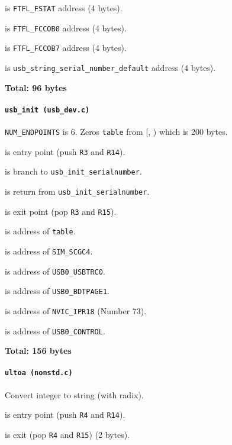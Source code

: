 \vspace{1em}

 is \texttt{FTFL\_FSTAT} address (4 bytes).

 is \texttt{FTFL\_FCCOB0} address (4 bytes).

 is \texttt{FTFL\_FCCOB7} address (4 bytes).

 is {\tiny
\texttt{usb\_string\_serial\_number\_default}} address (4 bytes).

\textbf{Total: 96 bytes}

\paragraph{\texttt{usb\_init (usb\_dev.c)}} \texttt{NUM\_ENDPOINTS} is 6.
Zeros \texttt{table} from [,
) which is 200 bytes.

 is entry point (push \texttt{R3} and \texttt{R14}).

 is branch to \texttt{usb\_init\_serialnumber}.

 is return from \texttt{usb\_init\_serialnumber}.

 is exit point (pop \texttt{R3} and \texttt{R15}).

 is address of \texttt{table}.

 is address of \texttt{SIM\_SCGC4}.

 is address of \texttt{USB0\_USBTRC0}.

 is address of \texttt{USB0\_BDTPAGE1}.

 is address of \texttt{NVIC\_IPR18} (Number 73).

 is address of \texttt{USB0\_CONTROL}.

\textbf{Total: 156 bytes}

\paragraph{\texttt{ultoa (nonstd.c)}} Convert integer to string (with radix).

 is entry point (push \texttt{R4} and \texttt{R14}).

 is exit (pop \texttt{R4} and \texttt{R15}) (2 bytes).

